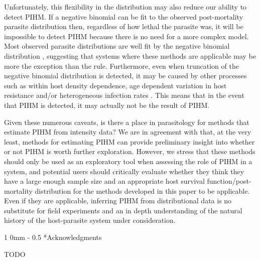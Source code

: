 \documentclass[12pt, a4paper]{article}
\makeatletter
\renewcommand{\section}{\@startsection
{section}%
{1}%
{0mm}%
{-\baselineskip}%
{0.5\baselineskip}%
{\normalfont\bf\large}} %
\makeatother
\begin{document}
Unfortunately, this
flexibility in the distribution may also reduce our ability to detect PIHM. If
a negative binomial can be fit to the observed post-mortality parasite
distribution then, regardless of how lethal the parasite was, it will be
impossible to detect PIHM because there is no need for a more complex model.
Most observed parasite distributions are well fit by the negative binomial distribution \citep{Shaw1998}, suggesting
that systems where these methods are applicable may be more the exception than
the rule.  Furthermore, even when truncation of the negative binomial distribution is detected, it may be caused by other
processes such as within host density dependence, age dependent variation in host
resistance and/or heterogeneous infection rates \citep{McCallum2000a,Anderson1982a,Rousset1996}.  This means that in the event
that PIHM is detected, it may actually not be the result of PIHM.

Given these numerous caveats, is there a place in parasitology for methods that
estimate PIHM from intensity data?  We are in agreement with
\cite{Lester1984} that, at the very least, methods for estimating PIHM can
provide preliminary insight into whether or not PIHM is worth further
exploration.  However, we stress that these methods should only be used as an
exploratory tool when assessing the role of PIHM in a system, and potential
users should critically evaluate whether they think they have a large enough
sample size and an appropriate host survival function/post-mortality distribution for the methods developed
in this paper to be applicable.  Even if they are applicable, inferring PIHM
from distributional data is no substitute for field experiments
and an in depth understanding of the natural history of the host-parasite
system under consideration.

\section*{Acknowledgments}

TODO


\singlespacing



\newpage

\renewcommand{\arraystretch}{1.2}
\end{document}
